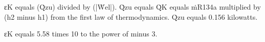 εK equals (Q̇zu) divided by (|Ẇel|).  
Q̇zu equals Q̇K equals ṁR134a multiplied by (h2 minus h1) from the first law of thermodynamics.  
Q̇zu equals 0.156 kilowatts.  

εK equals 5.58 times 10 to the power of minus 3.